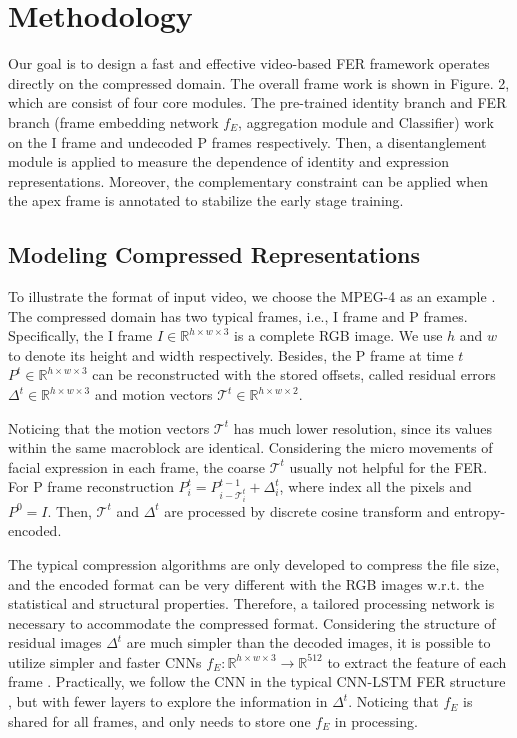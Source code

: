 \documentclass[a4paper,conference]{IEEEtran}
\begin{document}
\section{Methodology}

Our goal is to design a fast and effective video-based FER framework operates directly on the compressed domain. The overall frame work is shown in Figure. 2, which are consist of four core modules. The pre-trained identity branch and FER branch (frame embedding network $f_E$, aggregation module and Classifier) work on the I frame and undecoded P frames respectively. Then, a disentanglement module is applied to measure the dependence of identity and expression representations. Moreover, the complementary constraint can be applied when the apex frame is annotated to stabilize the early stage training.   



\subsection{Modeling Compressed Representations}

To illustrate the format of input video, we choose the MPEG-4 as an example \cite{richardson2003h264}. The compressed domain has two typical frames, i.e., I frame and P frames. Specifically, the I frame $I\in\mathbb{R}^{h\times w\times 3}$ is a complete RGB image. We use $h$ and $w$ to denote its height and width respectively. Besides, the P frame at time $t$ $P^t\in\mathbb{R}^{h\times w\times 3}$ can be reconstructed with the stored offsets, called residual errors $\Delta ^t\in\mathbb{R}^{h\times w\times 3}$ and motion vectors $\mathcal{T}^t\in\mathbb{R}^{h\times w\times 2}$. 


Noticing that the motion vectors $\mathcal{T}^t$ has much lower resolution, since its values within the same macroblock are identical. Considering the micro movements of facial expression in each frame, the coarse $\mathcal{T}^t$ usually not helpful for the FER. 
For P frame reconstruction $P_i^t=P_{i-\mathcal{T}_i^t}^{t-1}+\Delta_i^t$, where index all the pixels and $P^0=I$. Then, $\mathcal{T}^t$ and $\Delta ^t$ are processed by discrete cosine transform and entropy-encoded.



The typical compression algorithms are only developed to compress the file size, and the encoded format can be very different with the RGB images w.r.t. the statistical and structural properties. Therefore, a tailored processing network is necessary to accommodate the compressed format. Considering the structure of residual images $\Delta ^t$ are much simpler than the decoded images, it is possible to utilize simpler and faster CNNs $f_E:\mathbb{R}^{h\times w\times 3}\rightarrow \mathbb{R}^{512}$ to extract the feature of each frame \cite{kim2017multi,baddar2019mode}. Practically, we follow the 
CNN in the typical CNN-LSTM FER structure \cite{baddar2019mode,kim2017multi}, but with fewer layers to explore the information in $\Delta^t$. Noticing that $f_E$ is shared for all frames, and only needs to store one $f_E$ in processing.    
\end{document}
